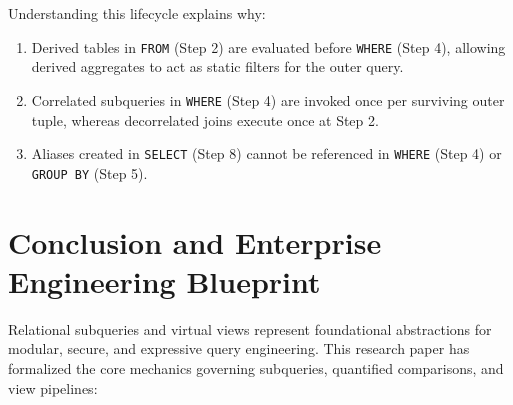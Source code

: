 \documentclass[10pt,twocolumn,letterpaper]{article}
\begin{document}
Understanding this lifecycle explains why:
\begin{enumerate}
    \item Derived tables in \texttt{FROM} (Step 2) are evaluated before \texttt{WHERE} (Step 4), allowing derived aggregates to act as static filters for the outer query.
    \item Correlated subqueries in \texttt{WHERE} (Step 4) are invoked once per surviving outer tuple, whereas decorrelated joins execute once at Step 2.
    \item Aliases created in \texttt{SELECT} (Step 8) cannot be referenced in \texttt{WHERE} (Step 4) or \texttt{GROUP BY} (Step 5).
\end{enumerate}

\section{Conclusion and Enterprise Engineering Blueprint}
\label{sec:conclusion}

Relational subqueries and virtual views represent foundational abstractions for modular, secure, and expressive query engineering. This research paper has formalized the core mechanics governing subqueries, quantified comparisons, and view pipelines:
\end{document}
